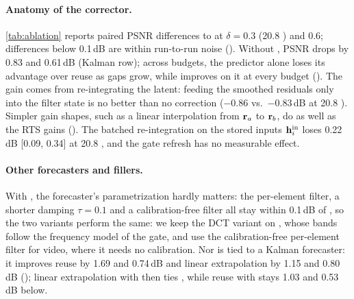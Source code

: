 \paragraph{Anatomy of the corrector.}
\cref{tab:ablation} reports paired PSNR differences to \ours at $\delta=0.3$ (20.8 \nfe) and $0.6$; differences below
0.1\,dB are within run-to-run noise (). Without \pcgs, PSNR drops by 0.83 and 0.61\,dB (Kalman row); across budgets, the predictor alone
loses its advantage over reuse as gaps grow, while \pcgs improves on it at every budget ().
The gain comes from re-integrating the latent: feeding the smoothed residuals only into the
filter state is no better than no correction ($-$0.86 vs.\ $-$0.83\,dB at 20.8 \nfe). Simpler gain shapes, such as a linear interpolation from $\mathbf{r}_a$ to $\mathbf{r}_b$, do as well as the RTS gains
(). The batched re-integration on the stored inputs $\mathbf{h}^{\mathrm{in}}_i$ loses 0.22\,dB [0.09, 0.34] at
20.8 \nfe, and the gate refresh has no measurable effect.

\paragraph{Other forecasters and fillers.}
With \pcgs, the forecaster's parametrization hardly matters: the per-element filter, a shorter damping $\tau=0.1$
and a calibration-free filter all stay within 0.1\,dB of \ours, so the two variants perform the same: we keep the DCT
variant on \flux, whose bands follow the frequency model of the \sea gate, and use the calibration-free per-element
filter for video, where it needs no calibration. Nor is \pcgs tied to a Kalman forecaster: it improves
reuse by 1.69 and 0.74\,dB and linear extrapolation by 1.15 and 0.80\,dB (); linear extrapolation with \pcgs
then ties \ours, while reuse with \pcgs stays 1.03 and 0.53\,dB below.
